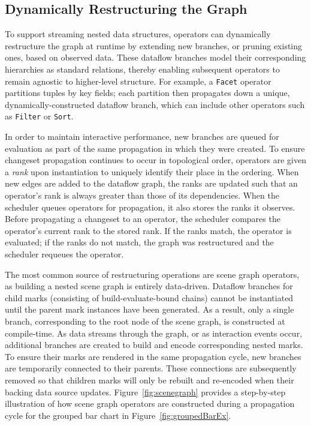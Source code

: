 \subsection{Dynamically Restructuring the Graph}

To support streaming nested data structures, operators can dynamically
restructure the graph at runtime by extending new branches, or pruning
existing ones, based on observed data. These dataflow branches model their
corresponding hierarchies as standard relations, thereby enabling subsequent
operators to remain agnostic to higher-level structure. For example, a
\texttt{Facet} operator partitions tuples by key fields; each partition then
propagates down a unique, dynamically-constructed dataflow branch, which can
include other operators such as \texttt{Filter} or \texttt{Sort}.

In order to maintain interactive performance, new branches are queued for
evaluation as part of the same propagation in which they were created. To
ensure changeset propagation continues to occur in topological order,
operators are given a \emph{rank} upon instantiation to uniquely identify
their place in the ordering. When new edges are added to the dataflow graph,
the ranks are updated such that an operator's rank is always greater than
those of its dependencies. When the scheduler queues operators for
propagation, it also stores the ranks it observes. Before propagating a
changeset to an operator, the scheduler compares the operator's current rank
to the stored rank. If the ranks match, the operator is evaluated; if the
ranks do not match, the graph was restructured and the scheduler requeues the
operator.

The most common source of restructuring operations are scene graph operators, as
building a nested scene graph is entirely data-driven. Dataflow branches for
child marks (consisting of build-evaluate-bound chains) cannot be instantiated
until the parent mark instances have been generated. As a result, only a single
branch, corresponding to the root node of the scene graph, is constructed at
compile-time. As data streams through the graph, or as interaction events occur,
additional branches are created to build and encode corresponding nested marks.
To ensure their marks are rendered in the same propagation cycle, new branches
are temporarily connected to their parents. These connections are subsequently
removed so that children marks will only be rebuilt and re-encoded when their
backing data source updates. Figure~\ref{fig:scenegraph} provides a step-by-step
illustration of how scene graph operators are constructed during a propagation
cycle for the grouped bar chart in Figure~\ref{fig:groupedBarEx}.